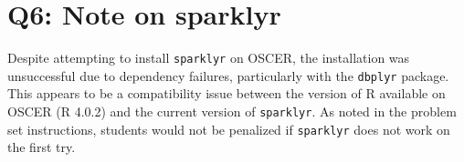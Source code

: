\documentclass{article}
\begin{document}
\section*{Q6: Note on sparklyr}
Despite attempting to install \texttt{sparklyr} on OSCER, the installation was 
unsuccessful due to dependency failures, particularly with the \texttt{dbplyr} 
package. This appears to be a compatibility issue between the version of R 
available on OSCER (R 4.0.2) and the current version of \texttt{sparklyr}. 
As noted in the problem set instructions, students would not be penalized if 
\texttt{sparklyr} does not work on the first try.
\end{document}
